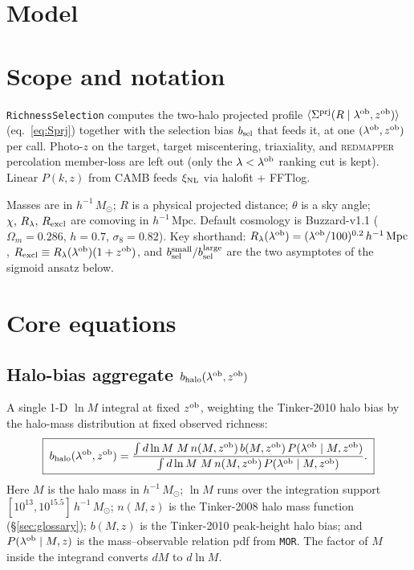 \documentclass[a4paper, 11pt]{article}
\newcommand{\lob}{\lambda^{\rm ob}}
\newcommand{\zob}{z^{\rm ob}}
\newcommand{\xinl}{\xi_{\rm NL}}
\newcommand{\hMpc}{h^{-1}\,\mathrm{Mpc}}
\newcommand{\hMsun}{h^{-1}\,M_{\odot}}
\newcommand{\bsel}{b_{\rm sel}}
\newcommand{\bhalo}{b_{\rm halo}}
\newcommand{\bsmall}{b_{\rm sel}^{\rm small}}
\newcommand{\blarge}{b_{\rm sel}^{\rm large}}
\newcommand{\Sprj}{\Sigma^{\rm prj}}
\newcommand{\avg}[1]{\langle #1 \rangle}
\begin{document}
\section*{\textcolor{harvardcrimson}{Model}}

\section{Scope and notation}

\texttt{RichnessSelection} computes the two-halo projected profile
\(\avg{\Sprj(R\mid\lob,\zob)}\) (eq.~\ref{eq:Sprj}) together with
the selection bias \(\bsel\) that feeds it, at one
\((\lob,\zob)\) per call. Photo-\(z\) on the target, target
miscentering, triaxiality, and \textsc{redmapper} percolation
member-loss are left out (only the \(\lambda<\lob\) ranking cut is
kept). Linear \(P(k,z)\) from CAMB feeds \(\xinl\) via halofit +
FFTlog.

Masses are in \(\hMsun\); \(R\) is a physical projected distance;
\(\theta\) is a sky angle; \(\chi,\,R_\lambda,\,R_{\rm excl}\) are
comoving in \(\hMpc\). Default cosmology is Buzzard-v1.1
(\(\Omega_m\!=\!0.286\), \(h\!=\!0.7\), \(\sigma_8\!=\!0.82\)). Key
shorthand: \(R_\lambda(\lob)=(\lob/100)^{0.2}\,\hMpc\),
\(R_{\rm excl}\equiv R_\lambda(\lob)(1+\zob)\), and
\(\bsmall/\blarge\) are the two asymptotes of the sigmoid ansatz
below.

\section{Core equations}

\subsection{Halo-bias aggregate \(\bhalo(\lob,\zob)\)}

A single 1-D \(\ln M\) integral at fixed \(\zob\), weighting the
Tinker-2010 halo bias by the halo-mass distribution at fixed
observed richness:
\begin{equation}
\boxed{\;
\bhalo(\lob,\zob)
 = \frac{\int d\ln M\;M\,n(M,\zob)\,b(M,\zob)\,P(\lob\mid M,\zob)}
        {\int d\ln M\;M\,n(M,\zob)\,P(\lob\mid M,\zob)}.
\;}
\label{eq:bhalo}
\end{equation}
Here \(M\) is the halo mass in \(\hMsun\); \(\ln M\) runs over the
integration support \([10^{13},10^{15.5}]\,\hMsun\); \(n(M,z)\) is the
Tinker-2008 halo mass function (\S\ref{sec:glossary});
\(b(M,z)\) is the Tinker-2010 peak-height halo bias; and
\(P(\lob\mid M,z)\) is the mass--observable relation pdf from
\texttt{MOR}. The factor of \(M\) inside the integrand converts
\(dM\) to \(d\ln M\).
\end{document}
